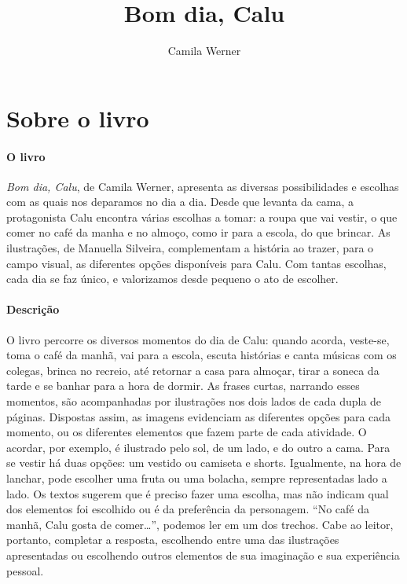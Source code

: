 \documentclass[11pt]{extarticle}
\newcommand{\AutorLivro}{Camila Werner}
\newcommand{\TituloLivro}{Bom dia, Calu}
\newcommand{\colaborador}{{Paulo Pompermaier e Renier Silva}}
\begin{document}
\title{\TituloLivro}
\author{\AutorLivro}
\def\authornotes{\colaborador}

\date{}
\maketitle


\tableofcontents



\section{Sobre o livro}

\paragraph{O livro} \textit{Bom dia, Calu}, de Camila Werner, apresenta as diversas possibilidades e escolhas com as quais nos deparamos no dia a dia. 
Desde que levanta da cama, a protagonista Calu encontra várias escolhas
a tomar: a roupa que vai vestir, o que comer no café da manha e no almoço,
como ir para a escola, do que brincar. As ilustrações, de Manuella Silveira, complementam a história ao trazer, para o campo visual, as diferentes opções disponíveis para Calu.
Com tantas escolhas, cada dia se faz único, e valorizamos desde pequeno o ato de escolher.


\paragraph{Descrição} O livro percorre os diversos momentos do dia de Calu: quando acorda, veste-se, toma o café da manhã, vai para a escola, escuta histórias e canta músicas com os colegas, brinca no recreio, até retornar a casa para almoçar, tirar a soneca da tarde e se banhar para a hora de dormir. As frases curtas, narrando esses momentos, são acompanhadas por ilustrações nos dois lados de cada dupla de páginas.
Dispostas assim, as imagens evidenciam as diferentes opções para cada momento, ou os diferentes elementos que fazem parte de cada atividade. O acordar, por exemplo, é ilustrado pelo sol, de um lado, e do outro a cama. Para se vestir há duas opções: um vestido ou camiseta e shorts. Igualmente, na hora de lanchar, pode escolher uma fruta ou uma bolacha, sempre representadas lado a lado. Os textos sugerem que é preciso fazer uma escolha, mas não indicam qual dos elementos foi escolhido ou é da preferência da personagem. ``No café da manhã, Calu gosta de comer\ldots'', podemos ler em um dos trechos. Cabe ao leitor, portanto, completar a resposta, escolhendo entre uma das ilustrações apresentadas ou escolhendo outros elementos de sua imaginação e sua experiência pessoal.
\end{document}
